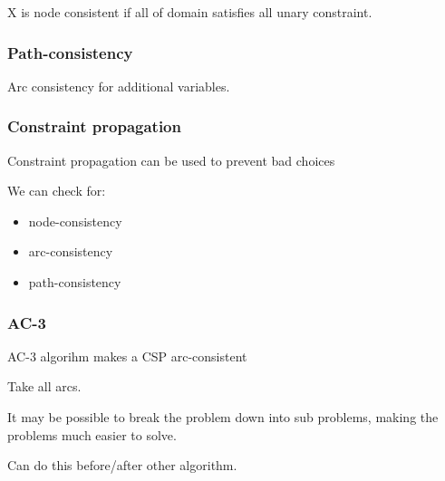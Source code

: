X is node consistent if all of domain satisfies all unary constraint.

\subsubsection{Path-consistency}

Arc consistency for additional variables.

\subsubsection{Constraint propagation}

Constraint propagation can be used to prevent bad choices

We can check for:

\begin{itemize}
\item node-consistency
\item arc-consistency
\item path-consistency
\end{itemize}

\subsubsection{AC-3}

AC-3 algorihm makes a CSP arc-consistent

Take all arcs.

It may be possible to break the problem down into sub problems, making the problems much easier to solve.

Can do this before/after other algorithm.

